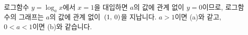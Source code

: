 \begin{figure}[h]
	\centering {}\
	\qquad\qquad
	\centering {}\
	\end{figure}


로그함수 $y=\log_a x$에서 $x=1$을 대입하면 $a$의 값에 관계 없이 $y=0$이므로, 로그함수의 그래프는 $a$의 값에 관계 없이 $\mathrm{}\left(1,\:0\right)$을 지납니다. $a>1$이면 (a)와 같고, $0<a<1$이면 (b)와 같습니다.

